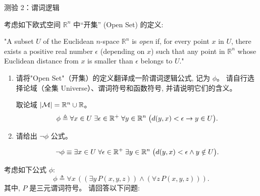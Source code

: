 
\begin{frame}[allowframebreaks]{测验 2：谓词逻辑}

\begin{problem}[一阶谓词逻辑公式]
  考虑如下欧式空间 $\mathbb{R}^{n}$ 中``开集'' (Open Set) 的定义:

  "A subset $U$ of the Euclidean $n$-space $\mathbb{R}^{n}$
    is {\it open} if, for every point $x$ in $U$,
    there exists a positive real number $\epsilon$
    (depending on $x$) such that any point in $\mathbb{R}^{n}$
    whose Euclidean distance from $x$ is smaller than $\epsilon$
    belongs to $U$."

  \begin{enumerate}[(1)]
    \item 请将"Open Set"（开集）的定义翻译成一阶谓词逻辑公式,
      记为 $\phi$。
      请自行选择论域（全集 Universe）、谓词符号和函数符号, 并请说明它们的含义。
      \begin{solution}
        取论域 $|\mathcal{M}|=\mathbb{R}^{n} \cup \mathbb{R}$。
        \[
          \phi \triangleq
          \forall x \in U \;\exists \epsilon \in \mathbb{R}^{+}\;
            \forall y \in \mathbb{R}^{n}\;
            \bigl(d(y,x) < \epsilon \to y \in U\bigr).
        \]
      \end{solution}
    \item 请给出 $\lnot \phi$ 公式。
      \begin{solution}
        \[
          \begin{aligned}
            \lnot\phi
              \equiv \exists x \in U \;\forall \epsilon \in \mathbb{R}^{+}\;\exists y \in \mathbb{R}^{n}\;
              \bigl(d(y,x) < \epsilon \land y \notin U\bigr).
          \end{aligned}
        \]
      \end{solution}
  \end{enumerate}
\end{problem}

\begin{problem}[一阶谓词逻辑的语法: 替换]
  考虑如下公式 $\phi$:
  \[
    \phi \triangleq \forall x\, ((\exists y\, P(x, y, z)) \land (\forall z\, P(x, y, z))).
  \]
  其中, $P$ 是三元谓词符号。
  请回答以下问题:


\end{problem}
\end{frame}

